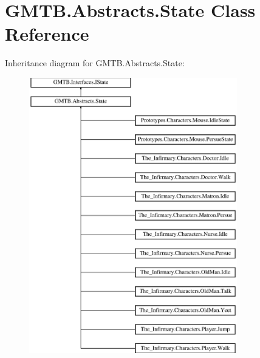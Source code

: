 \hypertarget{class_g_m_t_b_1_1_abstracts_1_1_state}{}\section{G\+M\+T\+B.\+Abstracts.\+State Class Reference}
\label{class_g_m_t_b_1_1_abstracts_1_1_state}
Inheritance diagram for G\+M\+T\+B.\+Abstracts.\+State\+:\begin{figure}[H]
\begin{center}
\leavevmode
\includegraphics[height=12.000000cm]{class_g_m_t_b_1_1_abstracts_1_1_state}
\end{center}
\end{figure}

